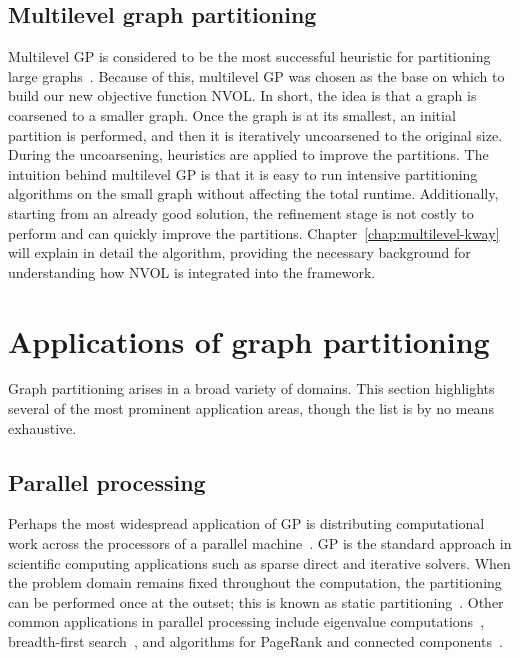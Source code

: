 \subsection{Multilevel graph partitioning}\label{multilevel_gp}
Multilevel GP is considered to be the most successful heuristic for partitioning large graphs~\cite{buluc_recent_2016, KarypisGeorge1998AFaH, karypis_parallel_1999}. Because of this, multilevel GP was chosen as the base on which to build our new objective function NVOL. In short, the idea is that a graph is coarsened to a smaller graph. Once the graph is at its smallest, an initial partition is performed, and then it is iteratively uncoarsened to the original size. During the uncoarsening, heuristics are applied to improve the partitions. The intuition behind multilevel GP is that it is easy to run intensive partitioning algorithms on the small graph without affecting the total runtime. Additionally, starting from an already good solution, the refinement stage is not costly to perform and can quickly improve the partitions. Chapter~\ref{chap:multilevel-kway} will explain in detail the algorithm, providing the necessary background for understanding how NVOL is integrated into the framework.

\section{Applications of graph partitioning}\label{applications_of_gpp}
Graph partitioning arises in a broad variety of domains. This section highlights several of the most prominent application areas, though the list is by no means exhaustive.

\subsection{Parallel processing}
Perhaps the most widespread application of GP is distributing computational work across the processors of a parallel machine~\cite{langguth_load-balanced_2020}. GP is the standard approach in scientific computing applications such as sparse direct and iterative solvers. When the problem domain remains fixed throughout the computation, the partitioning can be performed once at the outset; this is known as static partitioning~\cite{buluc_recent_2016}. Other common applications in parallel processing include eigenvalue computations~\cite{boman_scalable_2013}, breadth-first search~\cite{buluc_graph_2013}, and algorithms for PageRank and connected components~\cite{salihoglu_gps_2013}. 

